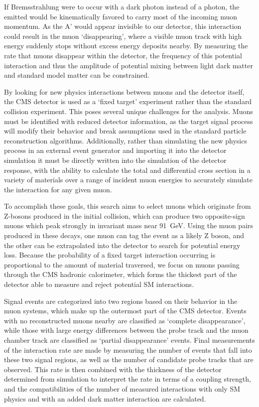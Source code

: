 If Bremsstrahlung were to occur with a dark photon instead of a photon, the emitted \aprime would be kinematically favored to carry most of the incoming muon momentum.
As the A' would appear invisible to our detector, this interaction could result in the muon `disappearing', where a visible muon track with high energy suddenly stops without excess energy deposits nearby.
By measuring the rate that muons disappear within the detector, the frequency of this potential interaction and thus the amplitude of potential mixing between light dark matter and standard model matter can be constrained.

By looking for new physics interactions between muons and the detector itself, the CMS detector is used as a `fixed target' experiment rather than the standard collision experiment.
This poses several unique challenges for the analysis.
Muons must be identified with reduced detector information, as the target signal process will modify their behavior and break assumptions used in the standard particle reconstruction algorithms.
Additionally, rather than simulating the new physics process in an external event generator and importing it into the detector simulation it must be directly written into the simulation of the detector response, with the ability to calculate the total and differential cross section in a variety of materials over a range of incident muon energies to accurately simulate the interaction for any given muon.

To accomplish these goals, this search aims to select muons which originate from Z-bosons produced in the initial collision, which can produce two opposite-sign muons which peak strongly in invariant mass near \SI{91}{\giga\eV}.
Using the muon pairs produced in these decays, one muon can tag the event as a likely Z boson, and the other can be extrapolated into the detector to search for potential energy loss.
Because the probability of a fixed target interaction occurring is proportional to the amount of material traversed, we focus on muons passing through the CMS hadronic calorimeter, which forms the thickest part of the detector able to measure and reject potential SM interactions.

Signal events are categorized into two regions based on their behavior in the muon systems, which make up the outermost part of the CMS detector. 
Events with no reconstructed muons nearby are classified as `complete disappearance', while those with large energy differences between the probe track and the muon chamber track are classified as `partial disappearance' events.
Final measurements of the interaction rate are made by measuring the number of events that fall into these two signal regions, as well as the number of candidate probe tracks that are observed.
This rate is then combined with the thickness of the detector determined from simulation to interpret the rate in terms of a coupling strength, and the compatibilities of the number of measured interactions with only SM physics and with an added dark matter interaction are calculated.

